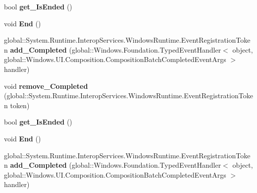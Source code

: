 \begin{DoxyCompactItemize}
bool {\bfseries get\+\_\+\+Is\+Ended} ()
\item 
\mbox{\label{interface_windows_1_1_u_i_1_1_composition_1_1_i_composition_scoped_batch_a6a716664cb94b74043a3dfc0119abd68}} 
void {\bfseries End} ()
\item 
\mbox{\label{interface_windows_1_1_u_i_1_1_composition_1_1_i_composition_scoped_batch_a8e6184255ede7485bdb1fd90fdc9b59c}} 
global\+::\+System.\+Runtime.\+Interop\+Services.\+Windows\+Runtime.\+Event\+Registration\+Token {\bfseries add\+\_\+\+Completed} (global\+::\+Windows.\+Foundation.\+Typed\+Event\+Handler$<$ object, global\+::\+Windows.\+U\+I.\+Composition.\+Composition\+Batch\+Completed\+Event\+Args $>$ handler)
\item 
\mbox{\label{interface_windows_1_1_u_i_1_1_composition_1_1_i_composition_scoped_batch_af4baa58c0bffd46f656f3fd7c4b1fdca}} 
void {\bfseries remove\+\_\+\+Completed} (global\+::\+System.\+Runtime.\+Interop\+Services.\+Windows\+Runtime.\+Event\+Registration\+Token token)
\item 
\mbox{\label{interface_windows_1_1_u_i_1_1_composition_1_1_i_composition_scoped_batch_a69a6c393c83900c6a83bce1ebc34c667}} 
bool {\bfseries get\+\_\+\+Is\+Ended} ()
\item 
\mbox{\label{interface_windows_1_1_u_i_1_1_composition_1_1_i_composition_scoped_batch_a6a716664cb94b74043a3dfc0119abd68}} 
void {\bfseries End} ()
\item 
\mbox{\label{interface_windows_1_1_u_i_1_1_composition_1_1_i_composition_scoped_batch_a8e6184255ede7485bdb1fd90fdc9b59c}} 
global\+::\+System.\+Runtime.\+Interop\+Services.\+Windows\+Runtime.\+Event\+Registration\+Token {\bfseries add\+\_\+\+Completed} (global\+::\+Windows.\+Foundation.\+Typed\+Event\+Handler$<$ object, global\+::\+Windows.\+U\+I.\+Composition.\+Composition\+Batch\+Completed\+Event\+Args $>$ handler)

\end{DoxyCompactItemize}
